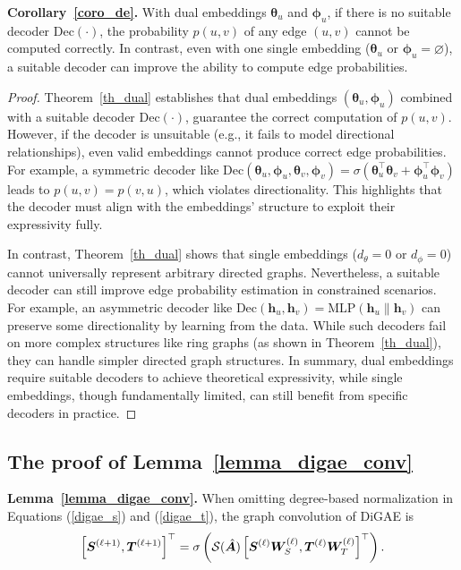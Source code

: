 \textbf{Corollary~\ref{coro_de}.} With dual embeddings $\bm{\theta}_u$ and $\bm{\phi}_u$, if there is no suitable decoder $\mathrm{Dec(\cdot)}$, the probability $p(u,v)$ of any edge $(u,v)$ cannot be computed correctly. In contrast, even with one single embedding ($\bm{\theta}_u$ or $\bm{\phi}_u = \varnothing$), a suitable decoder can improve the ability to compute edge probabilities.
\begin{proof} 

Theorem~\ref{th_dual} establishes that dual embeddings \((\bm{\theta}_u, \bm{\phi}_u)\) combined with a suitable decoder \(\mathrm{Dec}(\cdot)\), guarantee the correct computation of \(p(u,v)\). However, if the decoder is unsuitable (e.g., it fails to model directional relationships), even valid embeddings cannot produce correct edge probabilities. For example, a symmetric decoder like \(\mathrm{Dec}(\bm{\theta}_u, \bm{\phi}_u, \bm{\theta}_v, \bm{\phi}_v) = \sigma(\bm{\theta}_u^\top \bm{\theta}_v + \bm{\phi}_u^\top \bm{\phi}_v)\) leads to \(p(u,v) = p(v,u)\), which violates directionality. This highlights that the decoder must align with the embeddings' structure to exploit their expressivity fully.

In contrast, Theorem~\ref{th_dual} shows that single embeddings (\(d_\theta = 0\) or \(d_\phi = 0\)) cannot universally represent arbitrary directed graphs. Nevertheless, a suitable decoder can still improve edge probability estimation in constrained scenarios. For example, an asymmetric decoder like \(\mathrm{Dec}(\bm{h}_u, \bm{h}_v) = \mathrm{MLP}(\bm{h}_u \| \bm{h}_v)\) can preserve some directionality by learning from the data. While such decoders fail on more complex structures like ring graphs (as shown in Theorem~\ref{th_dual}), they can handle simpler directed graph structures. In summary, dual embeddings require suitable decoders to achieve theoretical expressivity, while single embeddings, though fundamentally limited, can still benefit from specific decoders in practice.
\end{proof}

\hypertarget{app_proof_lemma_digae_conv}{}
\subsection{The proof of Lemma~\ref{lemma_digae_conv}}\label{app_proof_lemma_digae_conv}
\textbf{Lemma~\ref{lemma_digae_conv}.} When omitting degree-based normalization in Equations (\ref{digae_s}) and (\ref{digae_t}), the graph convolution of DiGAE is
\begin{equation*}
\left[{\bm{S}}^{(\ell+1)},{\bm{T}}^{(\ell+1)}\right]^{\top} =\sigma\left(\mathcal{S}(\hat{{\bm{A}}})\left[{\bm{S}}^{(\ell)}{\bm{W}}_{S}^{(\ell)},{\bm{T}}^{(\ell)}{\bm{W}}_{T}^{(\ell)}\right]^{\top} \right). 
\end{equation*}

